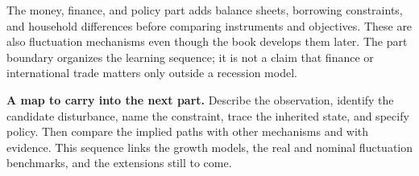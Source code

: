 The money, finance, and policy part adds balance sheets, borrowing constraints,
and household differences before comparing instruments and objectives. These
are also fluctuation mechanisms even though the book develops them later.
The part boundary organizes the learning sequence; it is not a claim that
finance or international trade matters only outside a recession model.

\begin{greenblock}
\textbf{A map to carry into the next part.}
Describe the observation, identify the candidate disturbance, name the constraint,
trace the inherited state, and specify policy. Then compare the implied paths
with other mechanisms and with evidence. This sequence links the growth models,
the real and nominal fluctuation benchmarks, and the extensions still to come.
\end{greenblock}
